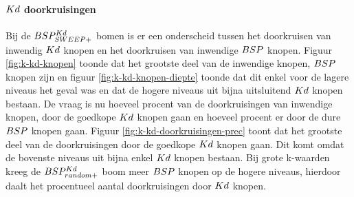 \paragraph{$Kd$ doorkruisingen}
Bij de $BSP^{Kd}_{SWEEP+}$ bomen is er een onderscheid tussen het doorkruisen van inwendig $Kd$ knopen en het doorkruisen van inwendige $BSP$ knopen. Figuur \ref{fig:k-kd-knopen} toonde dat het grootste deel van de inwendige knopen, $BSP$ knopen zijn en figuur \ref{fig:k-kd-knopen-diepte} toonde dat dit enkel voor de lagere niveaus het geval was en dat de hogere niveaus uit bijna uitsluitend $Kd$ knopen bestaan. De vraag is nu hoeveel procent van de doorkruisingen van inwendige knopen, door de goedkope $Kd$ knopen gaan en hoeveel procent er door de dure $BSP$ knopen gaan. Figuur \ref{fig:k-kd-doorkruisingen-prec} toont dat het grootste deel van de doorkruisingen door de goedkope $Kd$ knopen gaan. Dit komt omdat de bovenste niveaus uit bijna enkel $Kd$ knopen bestaan. Bij grote k-waarden kreeg de $BSP^{Kd}_{random+}$ boom meer $BSP$ knopen op de hogere niveaus, hierdoor daalt het procentueel aantal doorkruisingen door $Kd$ knopen.
